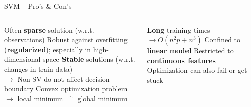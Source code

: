 \begin{frame}{SVM -- Pro's \& Con's}

\begin{columns}[T, totalwidth=\textwidth]
  \begin{column}{0.5\textwidth}
    \footnotesize
    \begin{itemize}
      \positem Often \textbf{sparse} solution (w.r.t. observations)
      \positem Robust against overfitting (\textbf{regularized}); especially in 
      high-dimensional space
      \positem \textbf{Stable} solutions (w.r.t. changes in train data)\\
      $\rightarrow$ Non-SV do not affect decision boundary
      \positem Convex optimization problem \\
      $\rightarrow$ local minimum $\hat{=}$ global minimum
    \end{itemize}
    
  \end{column}

  \begin{column}{0.5\textwidth}
    \footnotesize
    \begin{itemize}
      \negitem \textbf{Long} training times $\rightarrow O(n^2 p + n^3)$
      \negitem Confined to \textbf{linear model}
      \negitem Restricted to \textbf{continuous features}
      \negitem Optimization can also fail or get stuck
    \end{itemize}

  \end{column}
\end{columns}




\end{frame}
